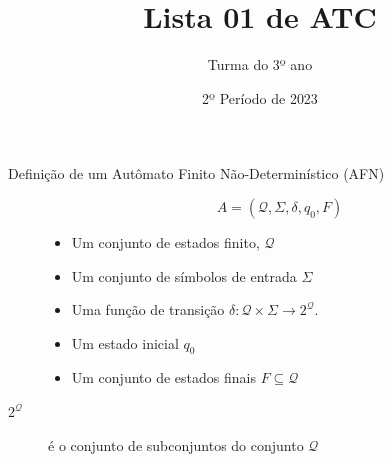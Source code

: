 \documentclass[11pt]{article}
\title{Lista 01 de ATC}
\date{2º Período de 2023}
\author{Turma do 3º ano}
\def\cQ{\mathcal{Q}}
\begin{document}
 


\maketitle

\begin{description}

\item[Definição de um Autômato Finito Não-Determinístico (AFN)]
\[A = (\cQ, \Sigma, \delta, q_0, F)\]
\begin{itemize}
\item Um conjunto de estados finito, $\cQ$
\item Um conjunto de símbolos de entrada $\Sigma$
\item Uma função de transição $\delta: \cQ\times\Sigma\rightarrow 2^\cQ$.
\item Um estado inicial $q_0$
\item Um conjunto de estados finais $F\subseteq \cQ$
\end{itemize}


\item[$2^\cQ$] é o conjunto de subconjuntos do conjunto $\cQ$


\end{description}


\vspace{1em}
\end{document}

